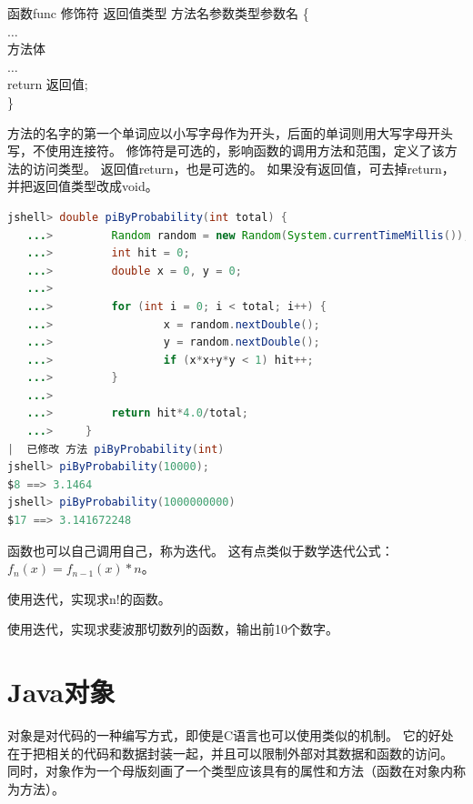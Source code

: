 \begin{definition}{函数}{func}
	修饰符 \textvisiblespace 返回值类型 \textvisiblespace 方法名\(参数类型 参数名\) \{ \\
  \codeident[1cm] $\dots$ \\
  \codeident[1cm] 方法体 \\
  \codeident[1cm] $\dots$ \\ 
  \codeident[1cm] return 返回值; \\
	\}
\end{definition}

\noindent
方法的名字的第一个单词应以小写字母作为开头，后面的单词则用大写字母开头写，不使用连接符。
修饰符是可选的，影响函数的调用方法和范围，定义了该方法的访问类型。
返回值return，也是可选的。
如果没有返回值，可去掉return，并把返回值类型改成void。
\bigskip
\begin{lstlisting}[language=Java, backgroundcolor=\color{lightgray!10}]
	jshell> double piByProbability(int total) {
   ...>         Random random = new Random(System.currentTimeMillis());
   ...>         int hit = 0;
   ...>         double x = 0, y = 0;
   ...> 
   ...>         for (int i = 0; i < total; i++) {
   ...>                 x = random.nextDouble();
   ...>                 y = random.nextDouble();
   ...>                 if (x*x+y*y < 1) hit++;
   ...>         }
   ...> 
   ...>         return hit*4.0/total;
   ...>     }
|  已修改 方法 piByProbability(int)
jshell> piByProbability(10000);
$8 ==> 3.1464
jshell> piByProbability(1000000000)
$17 ==> 3.141672248
\end{lstlisting}

\noindent
函数也可以自己调用自己，称为迭代。
这有点类似于数学迭代公式：$f_n(x) = f_{n-1}(x)*n$。

\bigskip
\begin{exercise}
	使用迭代，实现求n!的函数。
\end{exercise}

\begin{exercise}
	使用迭代，实现求斐波那切数列的函数，输出前10个数字。
\end{exercise}

\section{Java对象}
对象是对代码的一种编写方式，即使是C语言也可以使用类似的机制。
它的好处在于把相关的代码和数据封装一起，并且可以限制外部对其数据和函数的访问。
同时，对象作为一个母版刻画了一个类型应该具有的属性和方法（函数在对象内称为方法）。

